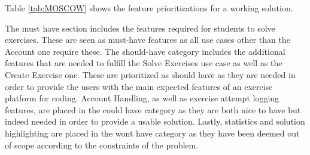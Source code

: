 Table \ref{tab:MOSCOW} shows the feature prioritizations for a working solution. 

The must have section includes the features required for students to solve exercises. These are seen as must-have features as all use cases other than the Account one require these.  
The should-have category includes the additional features that are needed to fulfill the Solve Exercises use case as well as the Create Exercise one. 
These are prioritized as should have as they are needed in order to provide the users with the main expected features of an exercise platform for coding. 
Account Handling, as well as exercise attempt logging features, are placed in the could have category as they are both nice to have but indeed needed in order to provide a usable solution. 
Lastly, statistics and solution highlighting are placed in the wont have category as they have been deemed out of scope according to the constraints of the problem.


